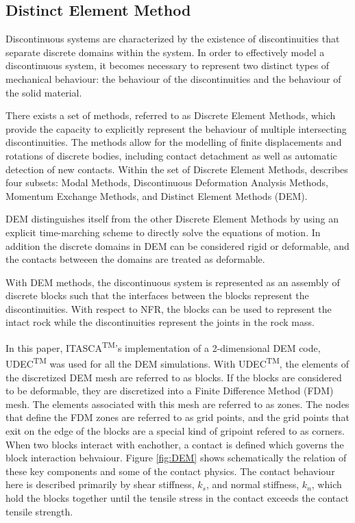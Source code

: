 \subsection{Distinct Element Method}
Discontinuous systems are characterized by the existence of discontinuities that separate discrete domains within the system. In order to effectively model a discontinuous system, it becomes necessary to represent two distinct types of mechanical behaviour: the behaviour of the discontinuities and the behaviour of the solid material.

There exists a set of methods, referred to as Discrete Element Methods, which provide the capacity to explicitly represent the behaviour of multiple intersecting discontinuities. The methods allow for the modelling of finite displacements and rotations of discrete bodies, including contact detachment as well as automatic detection of new contacts. Within the set of Discrete Element Methods, \citet{CUNDALL_1992} describes four subsets: Modal Methods, Discontinuous Deformation Analysis Methods, Momentum Exchange Methods, and Distinct Element Methods (DEM).

DEM distinguishes itself from the other Discrete Element Methods by using an explicit time-marching scheme to directly solve the equations of motion. In addition the discrete domains in DEM can be considered rigid or deformable, and the contacts betweeen the domains are treated as deformable.  

With DEM methods, the discontinuous system is represented as an assembly of discrete blocks such that the interfaces between the blocks represent the discontinuities. With respect to NFR, the blocks can be used to represent the intact rock while the discontinuities represent the joints in the rock mass. 

In this paper, ITASCA\textsuperscript{TM}'s implementation of a 2-dimensional DEM code, UDEC\textsuperscript{TM} was used for all the DEM simulations. With UDEC\textsuperscript{TM}, the elements of the discretized DEM mesh are referred to as blocks. If the blocks are considered to be deformable, they are discretized into a Finite Difference Method (FDM) mesh. The elements associated with this mesh are referred to as zones. The nodes that define the FDM zones are referred to as grid points, and the grid points that exit on the edge of the blocks are a special kind of gripoint refered to as corners. When two blocks interact with eachother, a contact is defined which governs the block interaction behvaiour.  Figure \ref{fig:DEM} shows schematically the relation of these key components and some of the contact physics. The contact behaviour here is described primarily by shear stiffness, $k_s$, and normal stiffness, $k_n$, which hold the blocks together until the tensile stress in the contact exceeds the contact tensile strength. 